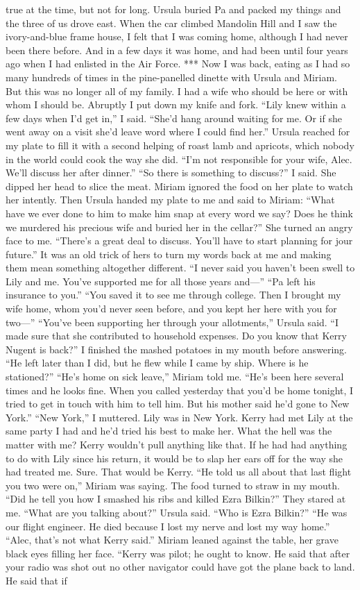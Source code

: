 \documentclass{novel}
\begin{document}
true at the time, but not for long. Ursula buried Pa and packed my things and the three of us drove east. When the car climbed Mandolin Hill and I saw the ivory-and-blue frame house, I felt that I was coming home, although I had never been there before. And in a few days it was home, and had been until four years ago when I had enlisted in the Air Force. *** Now I was back, eating as I had so many hundreds of times in the pine-panelled dinette with Ursula and Miriam. But this was no longer all of my family. I had a wife who should be here or with whom I should be. Abruptly I put down my knife and fork. “Lily knew within a few days when I’d get in,” I said. “She’d hang around waiting for me. Or if she went away on a visit she’d leave word where I could find her.” Ursula reached for my plate to fill it with a second helping of roast lamb and apricots, which nobody in the world could cook the way she did. “I’m not responsible for your wife, Alec. We’ll discuss her after dinner.” “So there is something to discuss?” I said. She dipped her head to slice the meat. Miriam ignored the food on her plate to watch her intently. Then Ursula handed my plate to me and said to Miriam: “What have we ever done to him to make him snap at every word we say? Does he think we murdered his precious wife and buried her in the cellar?” She turned an angry face to me. “There’s a great deal to discuss. You’ll have to start planning for jour future.” It was an old trick of hers to turn my words back at me and making them mean something altogether different. “I never said you haven’t been swell to Lily and me. You’ve supported me for all those years and—” “Pa left his insurance to you.” “You saved it to see me through college. Then I brought my wife home, whom you’d never seen before, and you kept her here with you for two—” “You’ve been supporting her through your allotments,” Ursula said. “I made sure that she contributed to household expenses. Do you know that Kerry Nugent is back?” I finished the mashed potatoes in my mouth before answering. “He left later than I did, but he flew while I came by ship. Where is he stationed?” “He’s home on sick leave,” Miriam told me. “He’s been here several times and he looks fine. When you called yesterday that you’d be home tonight, I tried to get in touch with him to tell him. But his mother said he’d gone to New York.” “New York,” I muttered. Lily was in New York. Kerry had met Lily at the same party I had and he’d tried his best to make her. What the hell was the matter with me? Kerry wouldn’t pull anything like that. If he had had anything to do with Lily since his return, it would be to slap her ears off for the way she had treated me. Sure. That would be Kerry. “He told us all about that last flight you two were on,” Miriam was saying. The food turned to straw in my mouth. “Did he tell you how I smashed his ribs and killed Ezra Bilkin?” They stared at me. “What are you talking about?” Ursula said. “Who is Ezra Bilkin?” “He was our flight engineer. He died because I lost my nerve and lost my way home.” “Alec, that’s not what Kerry said.” Miriam leaned against the table, her grave black eyes filling her face. “Kerry was pilot; he ought to know. He said that after your radio was shot out no other navigator could have got the plane back to land. He said that if 
\end{document}
